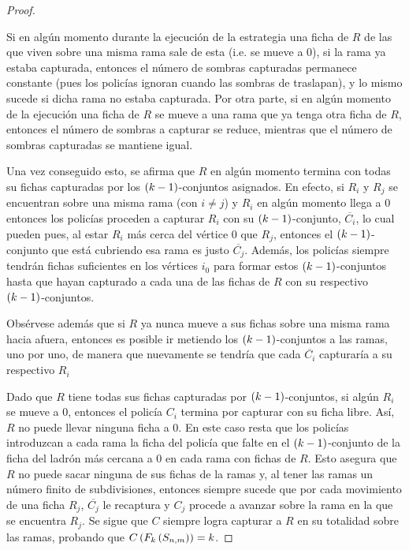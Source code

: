 \begin{proof}
\begin{enumerate}
            Si en alg\'un momento durante la ejecuci\'on de la estrategia una ficha
            de $R$ de las que viven sobre una misma rama sale de esta (i.e. se
            mueve a $0$), si la rama ya estaba capturada, entonces el n\'umero de
            sombras capturadas permanece constante (pues los polic\'ias ignoran
            cuando las sombras de traslapan), y lo mismo sucede si dicha rama no
            estaba capturada. Por otra parte, si en alg\'un momento de la
            ejecuci\'on una ficha de $R$ se mueve a una rama que ya tenga otra
            ficha de $R$, entonces el n\'umero de sombras a capturar se reduce,
            mientras que el n\'umero de sombras capturadas se mantiene igual.

            Una vez conseguido esto, se afirma que $R$ en alg\'un momento termina
            con todas su fichas capturadas por los $\left( k-1\right)$-conjuntos
            asignados. En efecto, si $R_i$ y $R_j$ se encuentran sobre una misma
            rama (con $i\neq j$) y $R_i$ en alg\'un momento llega a $0$ entonces
            los polic\'ias proceden a capturar $R_i$ con su $\left( k-1\right)$-conjunto,
            $\overline{C_i}$, lo cual pueden pues, al estar $R_i$ m\'as cerca del
            v\'ertice $0$ que $R_j$, entonces el $\left( k-1\right)$-conjunto que est\'a
            cubriendo esa rama es justo $\overline{C_j}$. Adem\'as, los polic\'ias
            siempre tendr\'an fichas suficientes en los v\'ertices $i_0$ para formar
            estos $\left( k-1\right)$-conjuntos hasta que hayan capturado a cada una de
            las fichas de $R$ con su respectivo $\left( k-1\right)$-conjuntos.
            
            Obs\'ervese adem\'as que si $R$ ya nunca mueve a sus fichas sobre una
            misma rama hacia afuera, entonces es posible ir metiendo los
            $\left( k-1\right)$-conjuntos a las ramas, uno por uno, de manera que
            nuevamente se tendr\'ia que cada $\overline{C_i}$ capturar\'ia a su
            respectivo $R_i$
        \end{enumerate}

        Dado que $R$ tiene todas sus fichas capturadas por $\left( k-1\right)$-conjuntos,
        si alg\'un $R_i$ se mueve a $0$, entonces el polic\'ia $C_i$ termina por
        capturar con su ficha libre. As\'i, $R$ no puede llevar ninguna ficha a
        $0$. En este caso resta que los polic\'ias introduzcan a cada rama la
        ficha del polic\'ia que falte en el $\left( k-1\right)$-conjunto de la ficha del
        ladr\'on m\'as cercana a $0$ en cada rama con fichas de $R$. Esto asegura
        que $R$ no puede sacar ninguna de sus fichas de la ramas y, al tener las
        ramas un n\'umero finito de subdivisiones, entonces siempre sucede que por
        cada movimiento de una ficha $R_j$, $\overline{C_j}$ le recaptura y $C_j$
        procede a avanzar sobre la rama en la que se encuentra $R_j$. Se sigue
        que $C$ siempre logra capturar a $R$ en su totalidad sobre las ramas,
        probando que $C\left( F_k\left( S_{n,m}\right)\right)=k$.
        
        \end{proof}